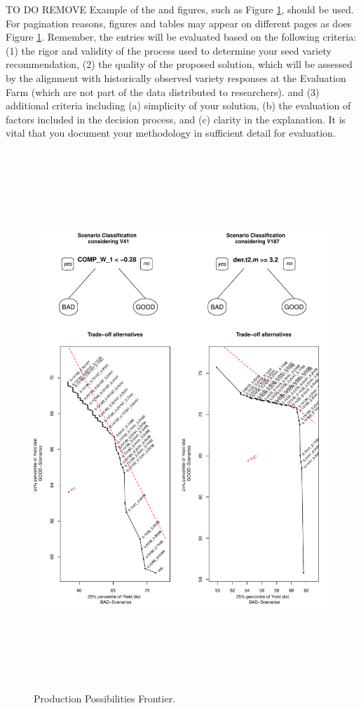 \documentclass[syngen,nonblindrev]{informs3-syngen}
\begin{document}
TO DO  REMOVE Example of the \cite{asi} and figures, such as  Figure \ref{frontier}, should be used. For pagination reasons, figures and tables may appear on different pages as does Figure \ref{frontier}.  Remember,  the entries will be evaluated based on the following criteria: (1) the rigor and validity of the process used to determine your seed variety recommendation, (2) the quality of the proposed solution, which will be assessed by the alignment with historically observed variety responses at the Evaluation Farm (which are not part of the data distributed to researchers). and (3) additional criteria including (a) simplicity of your solution, (b) the evaluation of factors included in the decision process, and (c) clarity in the explanation.  It is vital that you document your methodology in sufficient detail for evaluation. 

\begin{figure}[t]
\begin{center}
\includegraphics[height=8in]{Rplot1}
\caption{Production Possibilities Frontier.} \label{frontier}
\end{center}
\end{figure}
\end{document}
